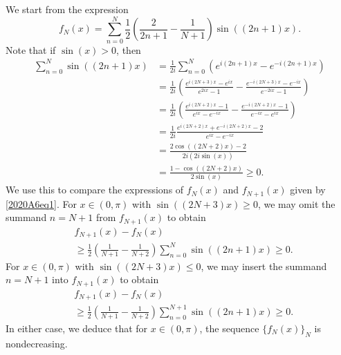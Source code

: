 \documentclass[amssymb,twocolumn,pra,10pt,aps]{revtex4-1}
\begin{document}
\begin{itemize}
We start from the expression
\begin{equation} \label{2020A6eq1}
f_N(x) = \sum_{n=0}^N \frac{1}{2} \left( \frac{2}{2n+1} - \frac{1}{N+1} \right) \sin((2n+1)x).
\end{equation}
Note that if $\sin(x) > 0$, then
\begin{align*}
\sum_{n=0}^N \sin((2n+1)x) &= \frac{1}{2i} \sum_{n=0}^N (e^{i(2n+1)x} - e^{-i(2n+1)x}) \\
&= \frac{1}{2i} \left( \frac{e^{i(2N+3)x} - e^{ix}}{e^{2ix} - 1}  -
\frac{e^{-i(2N+3)x} - e^{-ix}}{e^{-2ix} - 1} \right) \\
&=\frac{1}{2i} \left( \frac{e^{i(2N+2)x} - 1}{e^{ix} - e^{-ix}}  -
\frac{e^{-i(2N+2)x} - 1}{e^{-ix} - e^{ix}} \right) \\
&=\frac{1}{2i} \frac{e^{i(2N+2)x}+ e^{-i(2N+2)x} - 2}{e^{ix} - e^{-ix}} \\
&= \frac{2 \cos ((2N+2)x) - 2}{2i(2i \sin(x))} \\
&= \frac{1 - \cos ((2N+2)x)}{2\sin(x)} \geq 0.
\end{align*}
We use this to compare the expressions of $f_N(x)$ and $f_{N+1}(x)$ given by \eqref{2020A6eq1}.
For $x \in (0, \pi)$ with $\sin((2N+3)x) \geq 0$, we may omit the summand $n=N+1$ from $f_{N+1}(x)$ to obtain
\begin{align*}
& f_{N+1}(x) - f_N(x) \\
&\geq \frac{1}{2}  \left( \frac{1}{N+1} - \frac{1}{N+2} \right) \sum_{n=0}^N \sin((2n+1)x) \geq 0.
\end{align*}
For $x \in (0, \pi)$ with $\sin((2N+3)x) \leq 0$, we may insert the summand $n=N+1$ into $f_{N+1}(x)$ to obtain
\begin{align*}
&f_{N+1}(x) - f_N(x) \\
&\geq \frac{1}{2}  \left( \frac{1}{N+1} - \frac{1}{N+2} \right) \sum_{n=0}^{N+1} \sin((2n+1)x) \geq 0.
\end{align*}
In either case, we deduce that for $x \in (0, \pi)$, the sequence $\{f_N(x)\}_N$ is nondecreasing.


\end{itemize}
\end{document}
